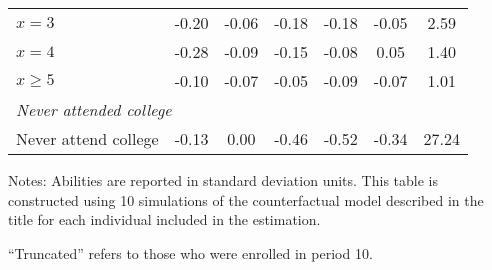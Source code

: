 \begin{table}[ht]
{\begin{threeparttable}
\begin{tabular}{lcccccc}
$x=3$&-0.20&-0.06&-0.18&-0.18&-0.05&2.59 \\
$x=4$&-0.28&-0.09&-0.15&-0.08&0.05&1.40 \\
$x\geq5$&-0.10&-0.07&-0.05&-0.09&-0.07&1.01 \\
\midrule
\multicolumn{7}{l}{\emph{Never attended college}}\\
Never attend college&-0.13&0.00&-0.46&-0.52&-0.34&27.24 \\
\bottomrule
\end{tabular}
\footnotesize Notes: Abilities are reported in standard deviation units. This table is constructed using 10 simulations of the counterfactual model described in the title for each individual included in the estimation.

\medskip

``Truncated'' refers to those who were enrolled in period 10.
\end{threeparttable}
}
\end{table}
